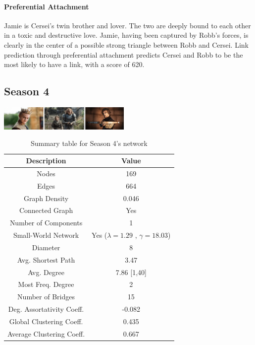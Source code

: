 \documentclass[10pt,twocolumn,letterpaper]{article}
\begin{document}
\paragraph{Preferential Attachment}

Jamie is Cersei's twin brother and lover. The two are deeply bound to each other in a toxic and destructive love. Jamie, having been captured by Robb's forces, is clearly in the center of a possible strong triangle between Robb and Cersei. Link prediction through preferential attachment predicts Cersei and Robb to be the most likely to have a link, with a score of 620.


\subsection{Season 4}

\begin{center}
    \includegraphics[width=0.48\textwidth]{img/s4/frames_s4.jpg}
\end{center}

\begin{table}[!h]
    \centering
    \small
    \begin{tabular}{c|c}
        Description & Value  \\
        \hline
        Nodes & 169\\
        Edges & 664 \\
        Graph Density & 0.046 \\
        Connected Graph & Yes \\
        Number of Components & 1 \\
        Small-World Network & Yes ($\lambda=1.29$ , $\gamma=18.03$) \\
        Diameter & 8 \\
        Avg. Shortest Path & 3.47 \\
        Avg. Degree & 7.86 [1,40] \\
        Most Freq. Degree & 2 \\
        Number of Bridges & 15 \\
        Deg. Assortativity Coeff. & -0.082\\
        Global Clustering Coeff. & 0.435 \\
        Average Clustering Coeff. & 0.667 \\
        \hline 
    \end{tabular}
    \vspace{0.2cm}
    \caption{Summary table for Season 4's network}
    \label{tab:my_label}
\end{table} \\
\end{document}
